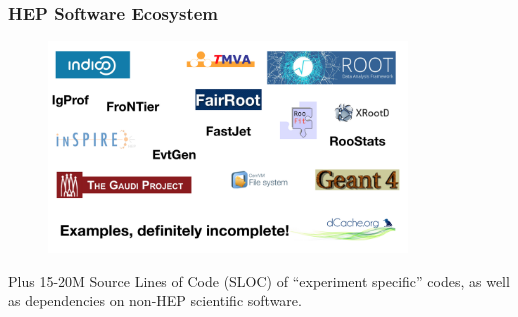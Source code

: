 \begin{frame}
\frametitle{HEP Software Ecosystem}

\begin{figure}[htbp]
\begin{center}
\includegraphics[width=0.85\textwidth]{images/hep-software-ecosystem.png}
\end{center}
\end{figure}
\small{Plus 15-20M Source Lines of Code (SLOC) of “experiment specific” codes, as well as dependencies on non-HEP scientific software.}
\end{frame}


